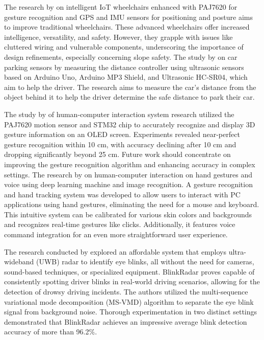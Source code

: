 \documentclass[conference,a4paper]{IEEEtran}
\begin{document}
The research by \cite{jianweiwheel} on intelligent IoT wheelchairs enhanced with PAJ7620 for gesture recognition and GPS and IMU sensors for positioning and posture aims to improve traditional wheelchairs. These advanced wheelchairs offer increased intelligence, versatility, and safety. However, they grapple with issues like cluttered wiring and vulnerable components, underscoring the importance of design refinements, especially concerning slope safety. The study by  \cite{jenlicar} on car parking sensors by measuring the distance controller using ultrasonic sensors based on Arduino Uno, Arduino MP3 Shield, and Ultrasonic HC-SR04, which aim to help the driver. The research aims to measure the car's distance from the object behind it to help the driver determine the safe distance to park their car. 

The study by \cite{wangthree} of human-computer interaction system research utilized the PAJ7620 motion sensor and STM32 chip to accurately recognize and display 3D gesture information on an OLED screen. Experiments revealed near-perfect gesture recognition within 10 cm, with accuracy declining after 10 cm and dropping significantly beyond 25 cm. Future work should concentrate on improving the gesture recognition algorithm and enhancing accuracy in complex settings. The research by  \cite{dhamanskar} on human-computer interaction on hand gestures and voice using deep learning machine and image recognition. A gesture recognition and hand tracking system was developed to allow users to interact with PC applications using hand gestures, eliminating the need for a mouse and keyboard. This intuitive system can be calibrated for various skin colors and backgrounds and recognizes real-time gestures like clicks. Additionally, it features voice command integration for an even more straightforward user experience. 

The research conducted by \cite{jhuuwb} explored an affordable system that employs ultra-wideband (UWB) radar to identify eye blinks, all without the need for cameras, sound-based techniques, or specialized equipment. BlinkRadar proves capable of consistently spotting driver blinks in real-world driving scenarios, allowing for the detection of drowsy driving incidents. The authors utilized the multi-sequence variational mode decomposition (MS-VMD) algorithm to separate the eye blink signal from background noise. Thorough experimentation in two distinct settings demonstrated that BlinkRadar achieves an impressive average blink detection accuracy of more than 96.2\%.
\end{document}
